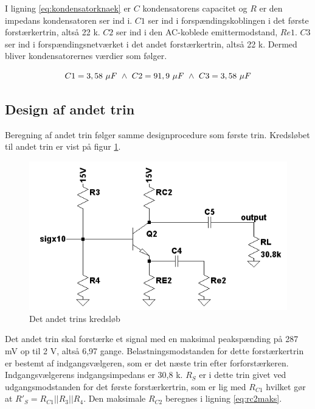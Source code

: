 I ligning \ref{eq:kondensatorknaek} er $C$ kondensatorens capacitet og $R$ er den impedans kondensatoren ser ind i. 
$C1$ ser ind i forspændingskoblingen i det første forstærkertrin, altså 22 k\Ohm. $C2$ ser ind i den AC-koblede emittermodstand, $Re1$. $C3$ ser ind i forspændingsnetværket i det andet forstærkertrin, altså 22 k\Ohm. Dermed bliver kondensatorernes værdier som følger.

\begin{equation}
C1=3,58~\mu F~\wedge ~C2=91,9~\mu F~\wedge ~C3=3,58~\mu F
\end{equation}



\subsection*{Design af andet trin}
Beregning af andet trin følger samme designprocedure som første trin. Kredsløbet til andet trin er vist på figur \ref{fig:andettrinkreds}.

\begin{figure}[h]
\centering
\includegraphics[scale=.6]{teknisk/forforstaerker/andettrinkreds.png}
\caption{Det andet trins kredsløb}
\label{fig:andettrinkreds}
\end{figure}

Det andet trin skal forstærke et signal med en maksimal peakspænding på 287 mV op til 2 V, altså 6,97 gange. Belastningsmodstanden for dette forstærkertrin er bestemt af indgangsvælgeren, som er det næste trin efter forforstærkeren. Indgangsvælgerens indgangsimpedans er 30,8 k\ohm {}. $R_S$ er i dette trin givet ved udgangsmodstanden for det første forstærkertrin, som er lig med $R_{C1}$ hvilket gør at $R'_S = R_{C1} || R_3 || R_4$. Den maksimale $R_{C2}$ beregnes i ligning \ref{eq:rc2maks}.

